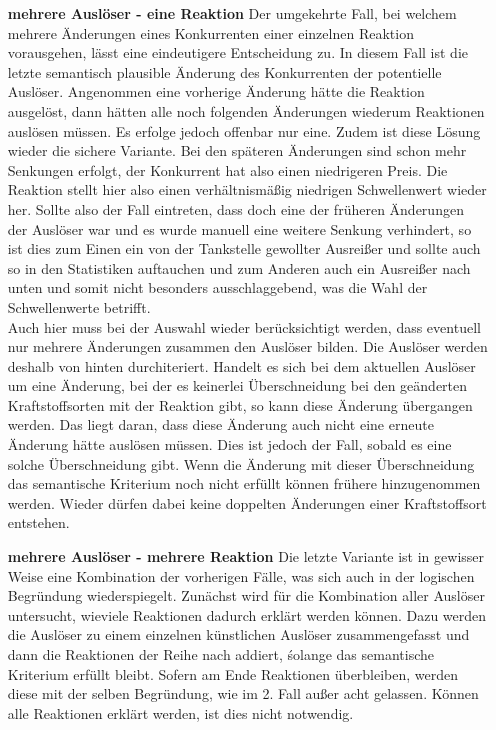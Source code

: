 \documentclass[12pt,a4paper,bibliography=totocnumbered,listof=totocnumbered]{scrartcl}
\begin{document}
\begin{enumerate}
\item [\textbf{mehrere Auslöser - eine Reaktion}]
Der umgekehrte Fall, bei welchem mehrere Änderungen eines Konkurrenten einer einzelnen Reaktion vorausgehen, lässt eine eindeutigere Entscheidung zu. In diesem Fall ist die letzte semantisch plausible Änderung des Konkurrenten der potentielle Auslöser. Angenommen eine vorherige Änderung hätte die Reaktion ausgelöst, dann hätten alle noch folgenden Änderungen wiederum Reaktionen auslösen müssen. Es erfolge jedoch offenbar nur eine. Zudem ist diese Lösung wieder die sichere Variante. Bei den späteren Änderungen sind schon mehr Senkungen erfolgt, der Konkurrent hat also einen niedrigeren Preis. Die Reaktion stellt hier also einen verhältnismäßig niedrigen Schwellenwert wieder her. Sollte also der Fall eintreten, dass doch eine der früheren Änderungen der Auslöser war und es wurde manuell eine weitere Senkung verhindert, so ist dies zum Einen ein von der Tankstelle gewollter Ausreißer und sollte auch so in den Statistiken auftauchen und zum Anderen auch ein Ausreißer nach unten und somit nicht besonders ausschlaggebend, was die Wahl der Schwellenwerte betrifft.\\
Auch hier muss bei der Auswahl wieder berücksichtigt werden, dass eventuell nur mehrere Änderungen zusammen den Auslöser bilden. Die Auslöser werden deshalb von hinten durchiteriert. Handelt es sich bei dem aktuellen Auslöser um eine Änderung, bei der es keinerlei Überschneidung bei den geänderten Kraftstoffsorten mit der Reaktion gibt, so kann diese Änderung übergangen werden. Das liegt daran, dass diese Änderung auch nicht eine erneute Änderung hätte auslösen müssen. Dies ist jedoch der Fall, sobald es eine solche Überschneidung gibt. Wenn die Änderung mit dieser Überschneidung das semantische Kriterium noch nicht erfüllt können frühere hinzugenommen werden. Wieder dürfen dabei keine doppelten Änderungen einer Kraftstoffsort entstehen.  

\item [\textbf{mehrere Auslöser - mehrere Reaktion}]
Die letzte Variante ist in gewisser Weise eine Kombination der vorherigen Fälle, was sich auch in der logischen Begründung wiederspiegelt. Zunächst wird für die Kombination aller Auslöser untersucht, wieviele Reaktionen dadurch erklärt werden können. Dazu werden die Auslöser zu einem einzelnen künstlichen Auslöser zusammengefasst und dann die Reaktionen der Reihe nach addiert, śolange das semantische Kriterium erfüllt bleibt. Sofern am Ende Reaktionen überbleiben, werden diese mit der selben Begründung, wie im 2. Fall außer acht gelassen. Können alle Reaktionen erklärt werden, ist dies nicht notwendig.\\


\end{enumerate}
\end{document}
